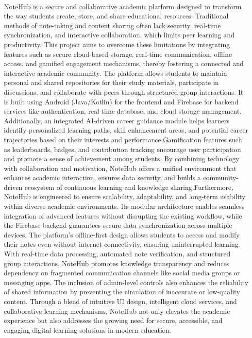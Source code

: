 \documentclass[12,Times new Roman,a4paper]{report}
\begin{document}
\paragraph{}
 NoteHub is a secure and collaborative academic platform designed to transform the way students create, store, and share educational resources. Traditional methods of note-taking and content sharing often lack security, real-time synchronization, and interactive collaboration, which limits peer learning and productivity. This project aims to overcome these limitations by integrating features such as secure cloud-based storage, real-time communication, offline access, and gamified engagement mechanisms, thereby fostering a connected and interactive academic community.
The platform allows students to maintain personal and shared repositories for their study materials, participate in discussions, and collaborate with peers through structured group interactions. It is built using Android (Java/Kotlin) for the frontend and Firebase for backend services like authentication, real-time database, and cloud storage management. Additionally, an integrated AI-driven career guidance module helps learners identify personalized learning paths, skill enhancement areas, and potential career trajectories based on their interests and performance.Gamification features such as leaderboards, badges, and contribution tracking encourage user participation and promote a sense of achievement among students. By combining technology with collaboration and motivation, NoteHub offers a unified environment that enhances academic interaction, ensures data security, and builds a community-driven ecosystem of continuous learning and knowledge sharing.Furthermore, NoteHub is engineered to ensure scalability, adaptability, and long-term usability within diverse academic environments. Its modular architecture enables seamless integration of advanced features without disrupting the existing workflow, while the Firebase backend guarantees secure data synchronization across multiple devices. The platform’s offline-first design allows students to access and modify their notes even without internet connectivity, ensuring uninterrupted learning. With real-time data processing, automated note verification, and structured group interactions, NoteHub promotes knowledge transparency and reduces dependency on fragmented communication channels like social media groups or messaging apps. The inclusion of admin-level controls also enhances the reliability of shared information by preventing the circulation of inaccurate or low-quality content. Through a blend of intuitive UI design, intelligent cloud services, and collaborative learning mechanisms, NoteHub not only elevates the academic experience but also addresses the growing need for secure, accessible, and engaging digital learning solutions in modern education.\\
\end{document}
